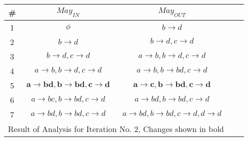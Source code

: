 \documentclass[12pt]{article}
\begin{document}
\begin{enumerate}
{\begin{center}
  \renewcommand{\arraystretch}{1.3}
  \hspace*{-25mm}\begin{tabular}{|c||c|c||c|c|} \hline
    {\bf \#} & {\bf $May_{IN}$} & {\bf $May_{OUT}$} \\ \hline \hline
    1 & $\phi$ & $b\rightarrow d$\\ \hline
    2 & $b\rightarrow d$ & $b\rightarrow d, c \rightarrow d$ \\ \hline
    3 & $b\rightarrow d, c \rightarrow d$ & $a
   \rightarrow b, b\rightarrow d,
    c \rightarrow d$ \\ \hline
    4 & $a \rightarrow b, b\rightarrow d,
    c \rightarrow d$ & $a \rightarrow b, b\rightarrow bd,
    c \rightarrow d$ \\ \hline
    5 & $\mathbf{a \rightarrow b d, b\rightarrow b d,
    c \rightarrow d}$ & $\mathbf{a \rightarrow c, b\rightarrow b d,
    c \rightarrow d}$ \\ \hline 
    6 & $a \rightarrow b c, b\rightarrow b d,
    c \rightarrow d$ & $a \rightarrow b d, b\rightarrow b d,
    c \rightarrow d$ \\ \hline
    7 & $a \rightarrow b d, b\rightarrow b d,
    c \rightarrow d$ & $a \rightarrow b d, b\rightarrow b d,
    c \rightarrow d, d \rightarrow d$ \\ \hline
    \multicolumn{3}{c}{  Result of Analysis for Iteration
      No. 2, Changes shown in bold}
  \end{tabular}
\end{center}

}
\end{enumerate}
\end{document}
